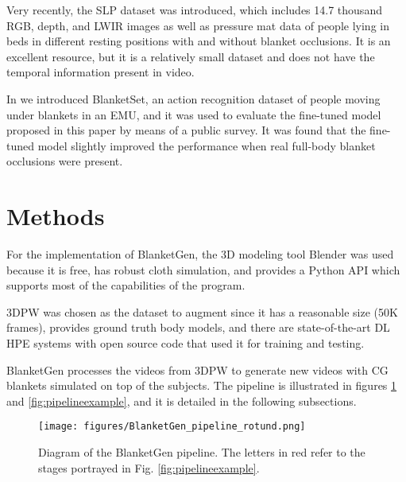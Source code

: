 \documentclass[conference]{IEEEtran}
\begin{document}
Very recently, the SLP dataset \cite{slp} was introduced, which includes 14.7 thousand RGB, depth, and LWIR images as well as pressure mat data of people lying in beds in different resting positions with and without blanket occlusions. It is an excellent resource, but it is a relatively small dataset and does not have the temporal information present in video.

In \cite{blanketset} we introduced BlanketSet, an action recognition dataset of people moving under blankets in an EMU, and it was used to evaluate the fine-tuned model proposed in this paper by means of a public survey. It was found that the fine-tuned model slightly improved the performance when real full-body blanket occlusions were present.


\section{Methods}
For the implementation of BlanketGen, the 3D modeling tool Blender \cite{blender} was used because it is free, has robust cloth simulation, and provides a Python API which supports most of the capabilities of the program.

3DPW \cite{3DPW} was chosen as the dataset to augment since it has a reasonable size (50K frames), provides ground truth body models, and there are state-of-the-art DL HPE systems with open source code that used it for training and testing.

BlanketGen processes the videos from 3DPW to generate new videos with CG blankets simulated on top of the subjects.
The pipeline is illustrated in figures \ref{fig:pipeline} and \ref{fig:pipelineexample}, and it is detailed in the following subsections.



\begin{figure}[htpb]
\centering
\texttt{[image: figures/BlanketGen\_pipeline\_rotund.png]} 
\caption{Diagram of the BlanketGen pipeline. The letters in red refer to the stages portrayed in Fig. \ref{fig:pipelineexample}.}
\label{fig:pipeline}
\end{figure}


\end{document}
